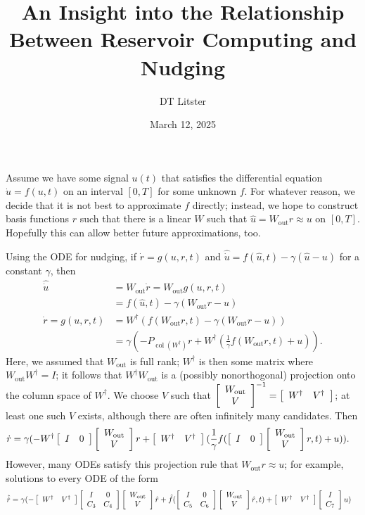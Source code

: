 \documentclass{article}
\title{An Insight into the Relationship Between Reservoir Computing and Nudging}
\date {March 12, 2025}
\author{DT Litster}
\newcommand{\mat}[2]{
    \IfInteger{#1}{
        \left[\begin{array}{*{#1}c} #2 \end{array}\right]
    }{
        \left[\begin{array}{#1} #2 \end{array}\right]}
    }
\newcommand{\Wout}{W_{\text{out}}}
\begin{document}
\maketitle

Assume we have some signal $u(t)$ that satisfies the differential equation $\dot u = f(u, t)$ on an interval $[0, T]$ for some unknown $f$. For whatever reason, we decide that it is not best to approximate $f$ directly; instead, we hope to construct basis functions $r$ such that there is a linear $W$ such that $\hat u = \Wout r \approx u$ on $[0, T]$. Hopefully this can allow better future approximations, too. 

Using the ODE for nudging, if $\dot r = g(u, r, t)$ and $\hat {\dot u} = f(\hat u, t) - \gamma (\hat u-u)$ for a constant $\gamma$, then 
\begin{align*}
    \hat{\dot u} &= \Wout \dot r = \Wout g(u, r, t) 
    \\
    &= f(\hat u, t) - \gamma(\Wout r-u)
    \\
    \dot r = g(u, r, t) &= W^\dagger (f(\Wout r, t) - \gamma(\Wout r-u))
    \\
    &= \gamma (-P_{\operatorname{col}(W^\dagger)}r + W^\dagger (\frac{1}{\gamma}f(\Wout r, t) + u)).
\end{align*}
Here, we assumed that $\Wout$ is full rank; $W^\dagger$ is then some matrix where $\Wout W^\dagger = I$; it follows that $W^\dagger \Wout$ is a (possibly nonorthogonal) projection onto the column space of $W^\dagger$. We choose $V$ such that $\mat{1}{\Wout \\ V}^{-1} = \mat{2}{W^\dagger & V^\dagger}$; at least one such $V$ exists, although there are often infinitely many candidates. Then  
\begin{align*}
    \dot r &= \gamma (-W^\dagger\mat{2}{I & 0}\mat{1}{\Wout\\V} r + \mat{2}{W^\dagger & V^\dagger}(\frac{1}{\gamma}f(\mat{2}{I & 0}\mat{1}{\Wout\\V} r, t) + u)).
\end{align*}
However, many ODEs satisfy this projection rule that $\Wout r \approx u$; for example, solutions to every ODE of the form
\begin{align*}
    \hat{\dot r} &= \gamma (-\mat{2}{W^\dagger & V^\dagger }\mat{2}{I & 0 \\ C_3 & C_4}\mat{1}{\Wout\\V} \hat r + \hat f(\mat{2}{I & 0 \\ C_5 & C_6}\mat{1}{\Wout\\V} \hat r, t) + \mat{2}{W^\dagger & V^\dagger}\mat{2}{I \\ C_7}u)
\end{align*}
\end{document}
